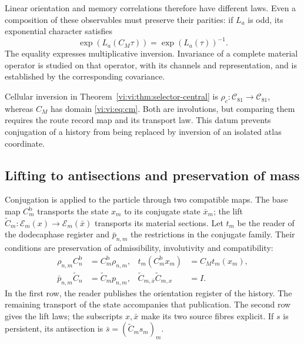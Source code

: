 Linear orientation and memory correlations therefore have
different laws. Even a composition of these observables must
preserve their parities: if $L_a$ is odd, its exponential character
satisfies
\begin{equation}
 \exp(L_a(C_M\tau))=\exp(L_a(\tau))^{-1}.
 \label{vi:vi:eq:caracter-inverso}
\end{equation}
The equality expresses multiplicative inversion. Invariance of a
complete material operator is studied on that operator, with its
channels and representation, and is established by the corresponding
covariance.

Cellular inversion in Theorem~\ref{vi:vi:thm:selector-central} is
$\rho_c:\mathcal C_{81}\to\mathcal C_{81}$, whereas $C_M$ has
domain \eqref{vi:vi:eq:cm}. Both are involutions, but comparing
them requires the route record map and its transport
law. This datum prevents conjugation of a history from being replaced
by inversion of an isolated atlas coordinate.

\subsection{Lifting to antisections and preservation of mass}
\label{vi:vi:subsec:antisecciones}

Conjugation is applied to the particle through two compatible
maps. The base map $C_m^{\mathrm b}$ transports the state
$x_m$ to its conjugate state $\bar x_m$; the lift
$\widetilde C_m:\mathscr E_m(x)\to\mathscr E_m(\bar x)$
transports its material sections. Let $t_m$ be the reader of the
dodecaphase register and $\bar p_{n,m}$ the restrictions in the
conjugate family. Their conditions are preservation of
admissibility, involutivity and compatibility:
\begin{equation}
 \begin{aligned}
 \rho_{n,m}C_n^{\mathrm b}&=C_m^{\mathrm b}\rho_{n,m},
 &t_m(C_m^{\mathrm b}x_m)&=C_Mt_m(x_m),\\
 \bar p_{n,m}\widetilde C_n&=\widetilde C_mp_{n,m},
 &\widetilde C_{m,\bar x}\widetilde C_{m,x}&=I.
 \end{aligned}
 \label{vi:vi:eq:levantamiento-cm}
\end{equation}
In the first row, the reader publishes the orientation register
of the history. The remaining transport of the state accompanies that
publication. The second row gives the lift laws;
the subscripts $x,\bar x$ make its two source fibres explicit.
If $s$ is persistent, its antisection is
$\bar s=(\widetilde C_ms_m)_m$.

